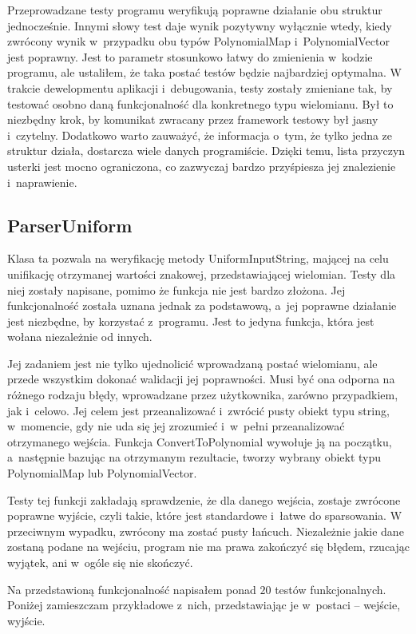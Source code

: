 Przeprowadzane testy programu weryfikują poprawne działanie obu struktur jednocześnie. Innymi słowy test daje wynik pozytywny wyłącznie wtedy, kiedy zwrócony wynik w~przypadku obu typów PolynomialMap i~PolynomialVector jest poprawny. Jest to parametr stosunkowo łatwy do zmienienia w~kodzie programu, ale ustaliłem, że taka postać testów będzie najbardziej optymalna. W trakcie dewelopmentu aplikacji i~debugowania, testy zostały zmieniane tak, by testować osobno daną funkcjonalność dla konkretnego typu wielomianu. Był to niezbędny krok, by komunikat zwracany przez framework testowy był jasny i~czytelny. Dodatkowo warto zauważyć, że informacja o~tym, że tylko jedna ze struktur działa, dostarcza wiele danych programiście. Dzięki temu, lista przyczyn usterki jest mocno ograniczona, co zazwyczaj bardzo przyśpiesza jej znalezienie i~naprawienie.

\subsection{ParserUniform}

Klasa ta pozwala na weryfikację metody UniformInputString, mającej na celu unifikację otrzymanej wartości znakowej, przedstawiającej wielomian. Testy dla niej zostały napisane, pomimo że funkcja nie jest bardzo złożona. Jej funkcjonalność została uznana jednak za podstawową, a~jej poprawne działanie jest niezbędne, by korzystać z~programu. Jest to jedyna funkcja, która jest wołana niezależnie od innych.

Jej zadaniem jest nie tylko ujednolicić wprowadzaną postać wielomianu, ale przede wszystkim dokonać walidacji jej poprawności. Musi być ona odporna na różnego rodzaju błędy, wprowadzane przez użytkownika, zarówno przypadkiem, jak i~celowo. Jej celem jest przeanalizować i~zwrócić pusty obiekt typu string, w~momencie, gdy nie uda się jej zrozumieć i~w~pełni przeanalizować otrzymanego wejścia. Funkcja ConvertToPolynomial wywołuje ją na początku, a~następnie bazując na otrzymanym rezultacie, tworzy wybrany obiekt typu PolynomialMap lub PolynomialVector.

Testy tej funkcji zakładają sprawdzenie, że dla danego wejścia, zostaje zwrócone poprawne wyjście, czyli takie, które jest standardowe i~łatwe do sparsowania. W przeciwnym wypadku, zwrócony ma zostać pusty łańcuch. Niezależnie jakie dane zostaną podane na wejściu, program nie ma prawa zakończyć się błędem, rzucając wyjątek, ani w~ogóle się nie skończyć.

Na przedstawioną funkcjonalność napisałem ponad $20$ testów funkcjonalnych. Poniżej zamieszczam przykładowe z~nich, przedstawiając je w~postaci -- wejście, wyjście. 

